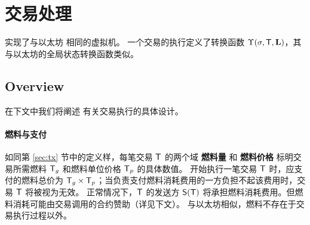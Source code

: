 

\section{交易处理}
\label{sec:tx_processing}

\name 实现了与以太坊 \cite{ETH_yellow} 相同的虚拟机。
一个交易的执行定义了转换函数 $\Upsilon(\mathbf{\sigma},\textsf{T},\mathbf{L})$，其与以太坊的全局状态转换函数类似。

\subsection{Overview}

在下文中我们将阐述 \name 有关交易执行的具体设计。

\paragraph{燃料与支付}
\label{subsec:gas_and_pay}

如同第 \ref{sec:tx} 节中的定义样，每笔交易 $\textsf{T}$ 的两个域 {\bf 燃料量} 和 {\bf 燃料价格} 标明交易所需燃料 $\textsf{T}_g$ 和燃料单位价格 $\textsf{T}_p$ 的具体数值。
开始执行一笔交易 $\textsf{T}$ 时，应支付的燃料总价为 $\textsf{T}_g \times \textsf{T}_p$；当负责支付燃料消耗费用的一方负担不起该费用时，交易 $\textsf{T}$ 将被视为无效。
正常情况下，$\textsf{T}$ 的发送方 $\mathsf{S}{\left({\textsf{T}} \right)}$ 将承担燃料消耗费用。但燃料消耗可能由交易调用的合约赞助（详见下文）。
与以太坊相似，燃料不存在于交易执行过程以外。


